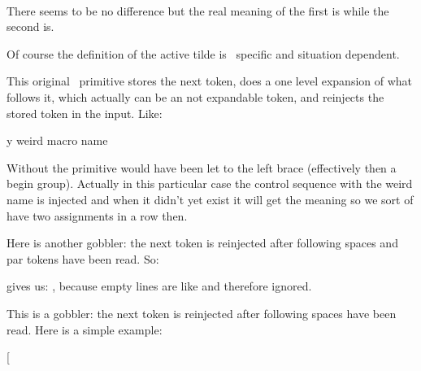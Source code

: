 \startbuffer
                          \meaningasis~
\edef\foo{~}              \meaningasis\foo
\edef\foo{\expandactive~} \meaningasis\foo
\stopbuffer

\typebuffer

There seems to be no difference but the real meaning of the first \type {\foo} is
 while the second \type {\foo}  is.


\startlines
\getbuffer
\stoplines

Of course the definition of the active tilde is \CONTEXT\ specific and situation
dependent.

\stopnewprimitive

\startoldprimitive[title={\prm {expandafter}}]

This original \TEX\ primitive stores the next token, does a one level expansion
of what follows it, which actually can be an not expandable token, and
reinjects the stored token in the input. Like:

\starttyping
\expandafter\let\csname my weird macro name
\stoptyping

Without  the  primitive would have been let to
the left brace (effectively then a begin group). Actually in this particular case
the control sequence with the weird name is injected and when it didn't yet exist
it will get the meaning  so we sort of have two assignments in a
row then.

\stopoldprimitive

\startnewprimitive[title={\prm {expandafterpars}}]

Here is another gobbler: the next token is reinjected after following spaces
and par tokens have been read. So:

\startbuffer
[\expandafterpars 1 2]
[\expandafterpars 3
4]
[\expandafterpars 5

6]
\stopbuffer

\typebuffer

gives us: \inlinebuffer, because empty lines are like  and therefore
ignored.

\stopnewprimitive

\startnewprimitive[title={\prm {expandafterspaces}}]

This is a gobbler: the next token is reinjected after following spaces have been
read. Here is a simple example:

\startbuffer
[\expandafterspaces 1 2]
[\expandafterspaces 3
4]
[

